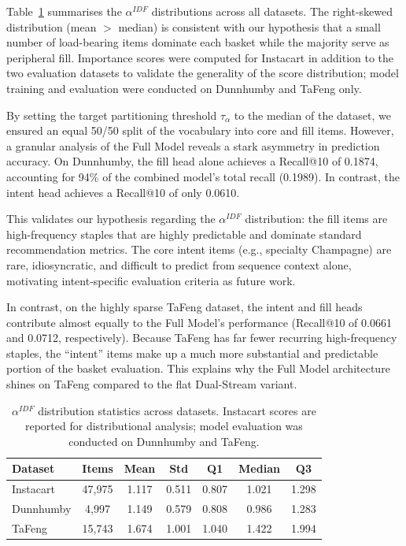 \documentclass[conference]{IEEEtran}
\begin{document}
Table~\ref{tab:importance_stats} summarises the $\alpha^{IDF}$ distributions across all datasets. The right-skewed distribution (mean $>$ median) is consistent with our hypothesis that a small number of load-bearing items dominate each basket while the majority serve as peripheral fill. Importance scores were computed for Instacart in addition to the two evaluation datasets to validate the generality of the score distribution; model training and evaluation were conducted on Dunnhumby and TaFeng only.

By setting the target partitioning threshold $\tau_\alpha$ to the median of the dataset, we ensured an equal 50/50 split of the vocabulary into core and fill items. However, a granular analysis of the Full Model reveals a stark asymmetry in prediction accuracy. On Dunnhumby, the fill head alone achieves a Recall@10 of 0.1874, accounting for 94\% of the combined model's total recall (0.1989). In contrast, the intent head achieves a Recall@10 of only 0.0610.

This validates our hypothesis regarding the $\alpha^{IDF}$ distribution: the fill items are high-frequency staples that are highly predictable and dominate standard recommendation metrics. The core intent items (e.g., specialty Champagne) are rare, idiosyncratic, and difficult to predict from sequence context alone, motivating intent-specific evaluation criteria as future work.

In contrast, on the highly sparse TaFeng dataset, the intent and fill heads contribute almost equally to the Full Model's performance (Recall@10 of 0.0661 and 0.0712, respectively). Because TaFeng has far fewer recurring high-frequency staples, the ``intent'' items make up a much more substantial and predictable portion of the basket evaluation. This explains why the Full Model architecture shines on TaFeng compared to the flat Dual-Stream variant.

\begin{table}[h]
\centering
\caption{$\alpha^{IDF}$ distribution statistics across datasets. Instacart scores are reported for distributional analysis; model evaluation was conducted on Dunnhumby and TaFeng.}
\label{tab:importance_stats}
\begin{tabular}{lcccccc}
\toprule
\textbf{Dataset} & \textbf{Items} & \textbf{Mean} & \textbf{Std} & \textbf{Q1} & \textbf{Median} & \textbf{Q3} \\
\midrule
Instacart  & 47{,}975 & 1.117 & 0.511 & 0.807 & 1.021 & 1.298 \\
Dunnhumby  &  4{,}997 & 1.149 & 0.579 & 0.808 & 0.986 & 1.283 \\
TaFeng     & 15{,}743 & 1.674 & 1.001 & 1.040 & 1.422 & 1.994 \\
\bottomrule
\end{tabular}
\end{table}
\end{document}

